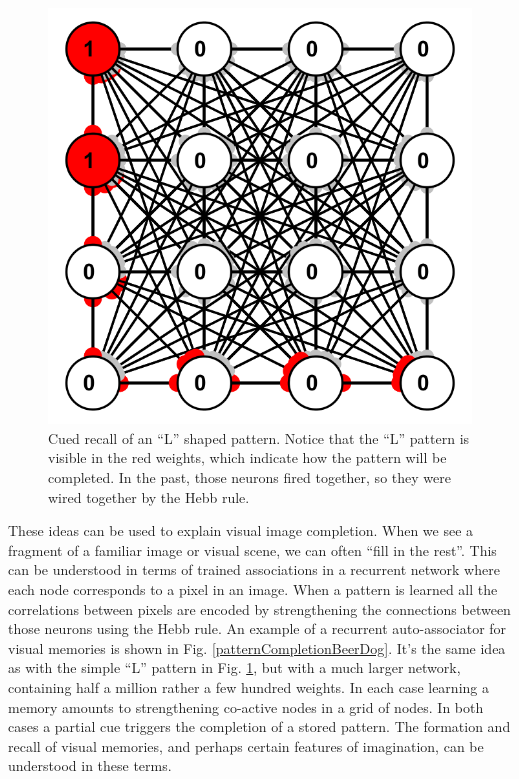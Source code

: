 \begin{figure}[h]
\centering
\includegraphics[scale=.5]{./images/patternCompletion_Cue}
\caption[Simbrain screenshot.]{Cued recall of an ``L'' shaped pattern. Notice that the ``L'' pattern is visible in the red weights, which indicate how the pattern will be completed. In the past, those neurons fired together, so they were wired together by the Hebb rule.}
\label{patternCompletionL}
\end{figure}

These ideas can be used to explain visual image completion. When we see a fragment of a familiar image or visual scene, we can often ``fill in the rest''. This can be understood in terms of trained associations in a recurrent network where each node corresponds to a pixel in an image. When a pattern is learned all the correlations between pixels are encoded by strengthening the connections between those neurons using the Hebb rule. An example of a recurrent auto-associator for visual memories is shown in Fig. \ref{patternCompletionBeerDog}. It's the same idea as with the simple ``L'' pattern in Fig. \ref{patternCompletionL}, but with a much larger network, containing half a million rather a few hundred weights. In each case learning a memory amounts to strengthening co-active nodes in a grid of nodes. In both cases a partial cue triggers the completion of a stored pattern. The formation and recall of visual memories, and perhaps certain features of imagination, can be understood in these terms. 

